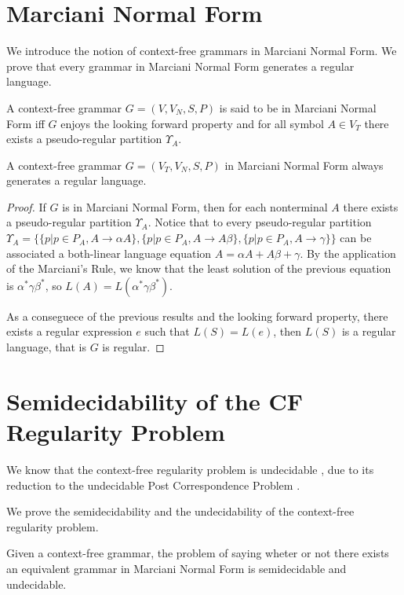 \documentclass[prodmode,acmtecs]{acmsmall}
\begin{document}
\section{Marciani Normal Form}
We introduce the notion of context-free grammars in Marciani Normal
Form. We prove that every grammar in Marciani Normal Form generates
a regular language.

\begin{definition}
	A context-free grammar $G=(V,V_{N},S,P)$
	is said to be in Marciani Normal Form iff $G$ enjoys the looking
	forward property and for all symbol $A\in V_{T}$ there exists a pseudo-regular
	partition $\Upsilon_{A}$.
\end{definition}

\begin{theorem}
	A context-free grammar $G=(V_{T},V_{N},S,P)$ in Marciani Normal Form always generates
	a regular language.
\end{theorem}

\begin{proof}
	If $G$ is in Marciani Normal Form, then for each nonterminal $A$
	there exists a pseudo-regular partition $\Upsilon_{A}$. Notice that
	to every pseudo-regular partition $\Upsilon_{A}=\{\{p|p\in P_{A},A\rightarrow\alpha A\},\{p|p\in P_{A},A\rightarrow A\beta\},\{p|p\in P_{A},A\rightarrow\gamma\}\}$
	can be associated a both-linear language equation $A=\alpha A+A\beta+\gamma$.
	By the application of the Marciani's Rule, we know that the least
	solution of the previous equation is $\alpha^{*}\gamma\beta^{*}$,
	so $L(A)=L(\alpha^{*}\gamma\beta^{*})$.

	As a conseguece of the previous results and the looking forward property,
	there exists a regular expression $e$ such that $L(S)=L(e)$, then
	$L(S)$ is a regular language, that is $G$ is regular.
\end{proof}


\section{Semidecidability of the CF Regularity Problem}
We know that the context-free regularity problem is undecidable \cite{Pettorossi13},
due to its reduction to the undecidable Post Correspondence Problem
\cite{Hopcroft06}.

We prove the semidecidability and the undecidability of the context-free
regularity problem.

\begin{theorem}
	Given a context-free grammar, the problem of saying wheter or not
	there exists an equivalent grammar in Marciani Normal Form is semidecidable
	and undecidable.
\end{theorem}
\end{document}
